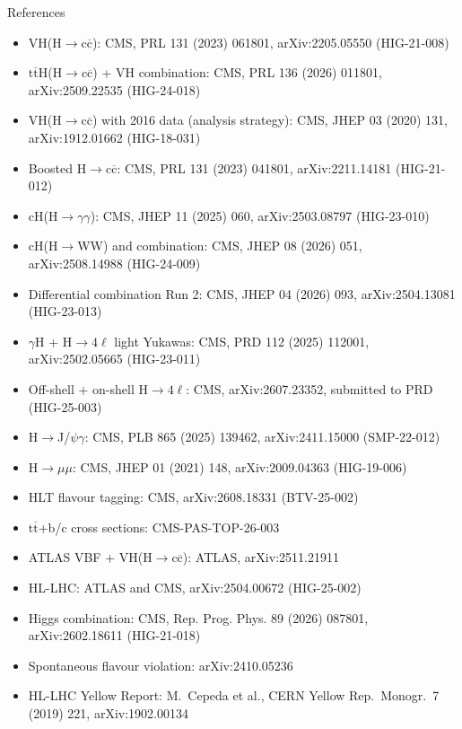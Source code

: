 \documentclass[aspectratio=169,10pt,xcolor=table]{beamer}
\newcommand{\qbar}[1]{\mathrm{#1}\overline{\mathrm{#1}}}
\newcommand{\Hcc}{\ensuremath{\mathrm{H}\to\qbar{c}}}
\newcommand{\ttH}{\ensuremath{\qbar{t}\mathrm{H}}}
\newcommand{\ttbar}{\ensuremath{\qbar{t}}}
\begin{document}
\begin{frame}{References}
  \scriptsize
  \begin{itemize}
    \item VH(\Hcc): CMS, PRL 131 (2023) 061801, arXiv:2205.05550 (HIG-21-008)
    \item \ttH(\Hcc) + VH combination: CMS, PRL 136 (2026) 011801, arXiv:2509.22535 (HIG-24-018)
    \item VH(\Hcc) with 2016 data (analysis strategy): CMS, JHEP 03 (2020) 131, arXiv:1912.01662 (HIG-18-031)
    \item Boosted \Hcc: CMS, PRL 131 (2023) 041801, arXiv:2211.14181 (HIG-21-012)
    \item cH(H$\to\gamma\gamma$): CMS, JHEP 11 (2025) 060, arXiv:2503.08797 (HIG-23-010)
    \item cH(H$\to$WW) and combination: CMS, JHEP 08 (2026) 051, arXiv:2508.14988 (HIG-24-009)
    \item Differential combination Run 2: CMS, JHEP 04 (2026) 093, arXiv:2504.13081 (HIG-23-013)
    \item $\gamma$H + H$\to4\ell$ light Yukawas: CMS, PRD 112 (2025) 112001, arXiv:2502.05665 (HIG-23-011)
    \item Off-shell + on-shell H$\to4\ell$: CMS, arXiv:2607.23352, submitted to PRD (HIG-25-003)
    \item H$\to$J/$\psi\gamma$: CMS, PLB 865 (2025) 139462, arXiv:2411.15000 (SMP-22-012)
    \item H$\to\mu\mu$: CMS, JHEP 01 (2021) 148, arXiv:2009.04363 (HIG-19-006)
    \item HLT flavour tagging: CMS, arXiv:2608.18331 (BTV-25-002)
    \item \ttbar+b/c cross sections: CMS-PAS-TOP-26-003
    \item ATLAS VBF + VH(\Hcc): ATLAS, arXiv:2511.21911
    \item HL-LHC: ATLAS and CMS, arXiv:2504.00672 (HIG-25-002)
    \item Higgs combination: CMS, Rep. Prog. Phys. 89 (2026) 087801, arXiv:2602.18611 (HIG-21-018)
    \item Spontaneous flavour violation: arXiv:2410.05236
    \item HL-LHC Yellow Report: M.~Cepeda et al., CERN Yellow Rep.\ Monogr.\ 7 (2019) 221, arXiv:1902.00134
  \end{itemize}
\end{frame}
\end{document}
